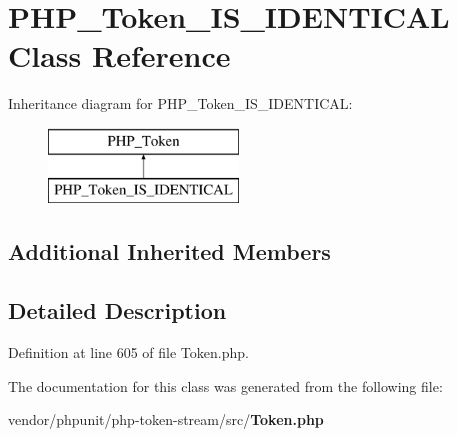 \section{P\+H\+P\+\_\+\+Token\+\_\+\+I\+S\+\_\+\+I\+D\+E\+N\+T\+I\+C\+A\+L Class Reference}
\label{class_p_h_p___token___i_s___i_d_e_n_t_i_c_a_l}
Inheritance diagram for P\+H\+P\+\_\+\+Token\+\_\+\+I\+S\+\_\+\+I\+D\+E\+N\+T\+I\+C\+A\+L\+:\begin{figure}[H]
\begin{center}
\leavevmode
\includegraphics[height=2.000000cm]{class_p_h_p___token___i_s___i_d_e_n_t_i_c_a_l}
\end{center}
\end{figure}
\subsection*{Additional Inherited Members}


\subsection{Detailed Description}


Definition at line 605 of file Token.\+php.



The documentation for this class was generated from the following file\+:\begin{DoxyCompactItemize}
\item 
vendor/phpunit/php-\/token-\/stream/src/{\bf Token.\+php}\end{DoxyCompactItemize}
